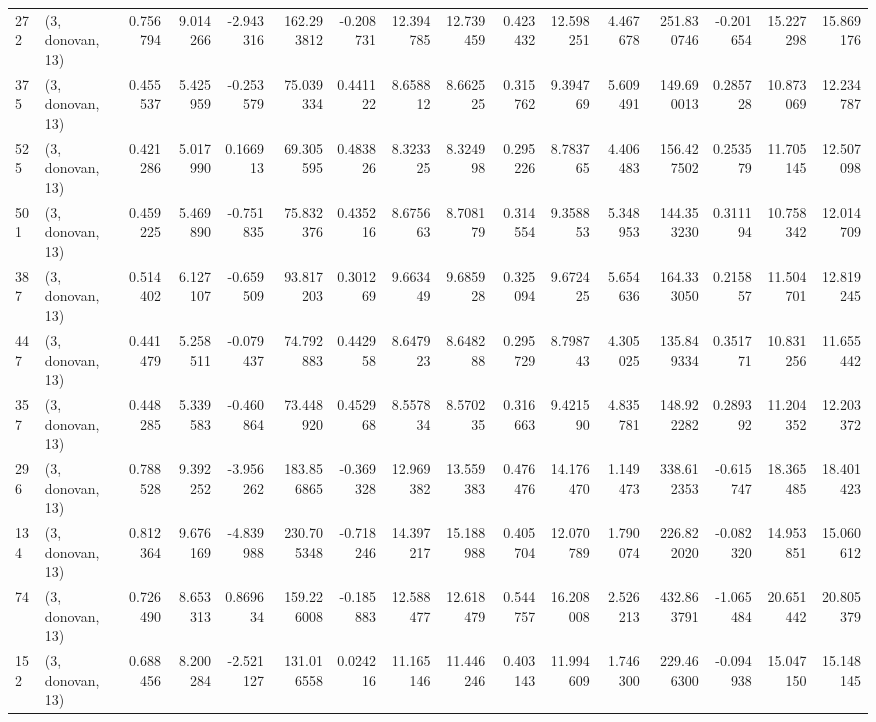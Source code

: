 \begin{tabular}{llrrrrrrrrrrrrrr}
272 &  (3, donovan, 13) &   0.756794 &   9.014266 &  -2.943316 &   162.293812 &  -0.208731 &  12.394785 &  12.739459 &  0.423432 &  12.598251 &   4.467678 &   251.830746 & -0.201654 &  15.227298 &  15.869176 \\
375 &  (3, donovan, 13) &   0.455537 &   5.425959 &  -0.253579 &    75.039334 &   0.441122 &   8.658812 &   8.662525 &  0.315762 &   9.394769 &   5.609491 &   149.690013 &  0.285728 &  10.873069 &  12.234787 \\
525 &  (3, donovan, 13) &   0.421286 &   5.017990 &   0.166913 &    69.305595 &   0.483826 &   8.323325 &   8.324998 &  0.295226 &   8.783765 &   4.406483 &   156.427502 &  0.253579 &  11.705145 &  12.507098 \\
501 &  (3, donovan, 13) &   0.459225 &   5.469890 &  -0.751835 &    75.832376 &   0.435216 &   8.675663 &   8.708179 &  0.314554 &   9.358853 &   5.348953 &   144.353230 &  0.311194 &  10.758342 &  12.014709 \\
387 &  (3, donovan, 13) &   0.514402 &   6.127107 &  -0.659509 &    93.817203 &   0.301269 &   9.663449 &   9.685928 &  0.325094 &   9.672425 &   5.654636 &   164.333050 &  0.215857 &  11.504701 &  12.819245 \\
447 &  (3, donovan, 13) &   0.441479 &   5.258511 &  -0.079437 &    74.792883 &   0.442958 &   8.647923 &   8.648288 &  0.295729 &   8.798743 &   4.305025 &   135.849334 &  0.351771 &  10.831256 &  11.655442 \\
357 &  (3, donovan, 13) &   0.448285 &   5.339583 &  -0.460864 &    73.448920 &   0.452968 &   8.557834 &   8.570235 &  0.316663 &   9.421590 &   4.835781 &   148.922282 &  0.289392 &  11.204352 &  12.203372 \\
296 &  (3, donovan, 13) &   0.788528 &   9.392252 &  -3.956262 &   183.856865 &  -0.369328 &  12.969382 &  13.559383 &  0.476476 &  14.176470 &   1.149473 &   338.612353 & -0.615747 &  18.365485 &  18.401423 \\
134 &  (3, donovan, 13) &   0.812364 &   9.676169 &  -4.839988 &   230.705348 &  -0.718246 &  14.397217 &  15.188988 &  0.405704 &  12.070789 &   1.790074 &   226.822020 & -0.082320 &  14.953851 &  15.060612 \\
74  &  (3, donovan, 13) &   0.726490 &   8.653313 &   0.869634 &   159.226008 &  -0.185883 &  12.588477 &  12.618479 &  0.544757 &  16.208008 &   2.526213 &   432.863791 & -1.065484 &  20.651442 &  20.805379 \\
152 &  (3, donovan, 13) &   0.688456 &   8.200284 &  -2.521127 &   131.016558 &   0.024216 &  11.165146 &  11.446246 &  0.403143 &  11.994609 &   1.746300 &   229.466300 & -0.094938 &  15.047150 &  15.148145 \\

\end{tabular}
